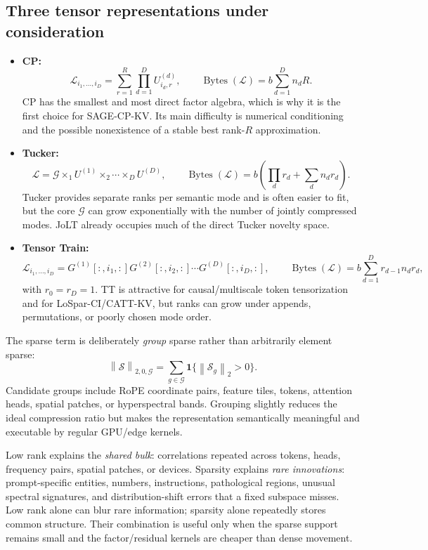 \documentclass[10pt]{article}
\newcommand{\norm}[1]{\left\lVert #1\right\rVert}
\newcommand{\bytes}{\operatorname{Bytes}}
\begin{document}
\subsection{Three tensor representations under consideration}

\begin{itemize}[leftmargin=1.55em,itemsep=3pt]
\item \textbf{CP:}
\[
\mathcal L_{i_1,\ldots,i_D}
=\sum_{r=1}^{R}\prod_{d=1}^{D}U^{(d)}_{i_d,r},
\qquad
\bytes(\mathcal L)=b\sum_{d=1}^{D}n_dR.
\]
CP has the smallest and most direct factor algebra, which is why it is the first choice for
SAGE-CP-KV. Its main difficulty is numerical conditioning and the possible nonexistence of a
stable best rank-$R$ approximation.
\item \textbf{Tucker:}
\[
\mathcal L=\mathcal G\times_1 U^{(1)}\times_2\cdots\times_D U^{(D)},\qquad
\bytes(\mathcal L)=b\left(\prod_d r_d+\sum_dn_dr_d\right).
\]
Tucker provides separate ranks per semantic mode and is often easier to fit, but the core
$\mathcal G$ can grow exponentially with the number of jointly compressed modes. JoLT already
occupies much of the direct Tucker novelty space.
\item \textbf{Tensor Train:}
\[
\mathcal L_{i_1,\ldots,i_D}
=G^{(1)}[:,i_1,:]G^{(2)}[:,i_2,:]\cdots G^{(D)}[:,i_D,:],
\qquad
\bytes(\mathcal L)=b\sum_{d=1}^{D}r_{d-1}n_dr_d,
\]
with $r_0=r_D=1$. TT is attractive for causal/multiscale token tensorization and for
LoSpar-CI/CATT-KV, but ranks can grow under appends, permutations, or poorly chosen mode order.
\end{itemize}

The sparse term is deliberately \emph{group} sparse rather than arbitrarily element sparse:
\[
\norm{\mathcal S}_{2,0,\mathcal G}
=\sum_{g\in\mathcal G}\mathbf 1\{\norm{\mathcal S_g}_2>0\}.
\]
Candidate groups include RoPE coordinate pairs, feature tiles, tokens, attention heads, spatial
patches, or hyperspectral bands. Grouping slightly reduces the ideal compression ratio but makes
the representation semantically meaningful and executable by regular GPU/edge kernels.

\begin{keybox}[title={Why low rank and sparsity are complementary}]
Low rank explains the \emph{shared bulk}: correlations repeated across tokens, heads, frequency
pairs, spatial patches, or devices. Sparsity explains \emph{rare innovations}: prompt-specific
entities, numbers, instructions, pathological regions, unusual spectral signatures, and
distribution-shift errors that a fixed subspace misses. Low rank alone can blur rare information;
sparsity alone repeatedly stores common structure. Their combination is useful only when the
sparse support remains small and the factor/residual kernels are cheaper than dense movement.
\end{keybox}
\end{document}

